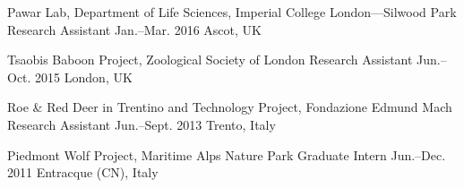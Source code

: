 \begin{cventries}
  \cventry
    {Pawar Lab, Department of Life Sciences, Imperial College London---Silwood Park} %
    {Research Assistant} %
    {Jan.--Mar. 2016} %
    {Ascot, UK} %
    {}

    
  \cventry
    {Tsaobis Baboon Project, Zoological Society of London} %
    {Research Assistant} %
    {Jun.--Oct. 2015} %
    {London, UK} %
    {}

    
  \cventry
    {Roe \& Red Deer in Trentino and Technology Project, Fondazione Edmund Mach} %
    {Research Assistant} %
    {Jun.--Sept. 2013} %
    {Trento, Italy} %
    {}

    
  \cventry
    {Piedmont Wolf Project, Maritime Alps Nature Park} %
    {Graduate Intern} %
    {Jun.--Dec. 2011} %
    {Entracque (CN), Italy} %
    {}

    

\end{cventries}
